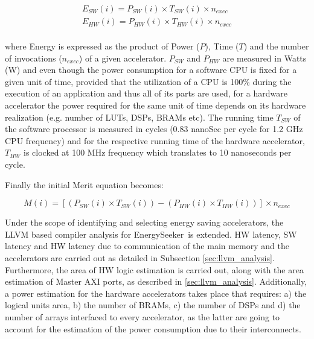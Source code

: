 \documentclass[]{usiinfthesis}
\newcommand{\eseeker}{{EnergySeeker}}
\begin{document}
\begin{equation*}
\begin{aligned}
E_{SW}(i) = P_{SW}(i) \times T_{SW}(i) \times n_{exec}\\
E_{HW}(i) = P_{HW}(i) \times T_{HW}(i) \times n_{exec}\\
\end{aligned}
\end{equation*}

where Energy is expressed as the product of Power ($P$), Time ($T$) and the number of invocations ($n_{exec}$) 
of a given accelerator. $P_{SW}$ and $P_{HW}$ are measured in Watts (W) and even though 
the power consumption for a software CPU is fixed for a given unit of time, provided that the utilization of a 
CPU is 100\% during the execution of an application and thus all of its parts are used, for a hardware 
accelerator the power required for the same unit of time depends on its hardware realization 
(e.g. number of LUTs, DSPs, BRAMs etc). The running time $T_{SW}$ of the software processor 
is measured in cycles (0.83 nanoSec per cycle for 1.2 GHz CPU frequency) and for the respective
running time of the hardware accelerator, $T_{HW}$ is clocked at 100 MHz frequency which
translates to 10 nanoseconds per cycle.

Finally the initial Merit equation becomes: 

\begin{equation*}
M(i)  = [ (P_{SW}(i) \times T_{SW}(i)) - (P_{HW}(i) \times T_{HW}(i)) ] \times n_{exec}
\end{equation*}




Under the scope of identifying and selecting energy saving accelerators, the LLVM based compiler 
analysis for \eseeker\ is extended. HW latency, SW latency and HW latency due to communication
of the main memory and the accelerators are carried out as detailed in Subsection 
\ref{sec:llvm_analysis}. Furthermore, the area of HW logic estimation is carried out, along
with the area estimation of Master AXI ports, as described in \ref{sec:llvm_analysis}. Additionally,
a power estimation for the hardware accelerators takes place that requires: a) the logical
units area, b) the number of BRAMs, c) the number of DSPs and d) the number of arrays interfaced to every 
accelerator, as the latter are going to account for the estimation of the power consumption due to
their interconnects.
\end{document}
